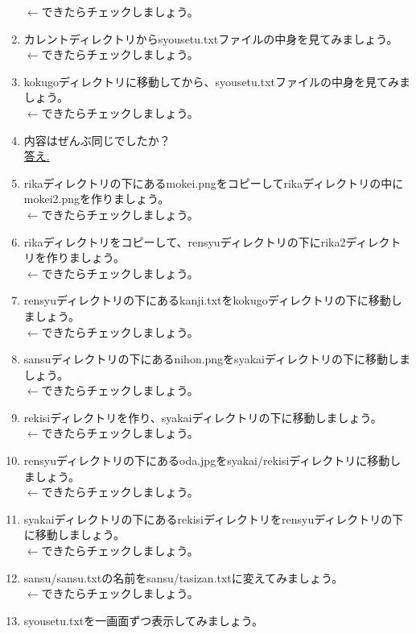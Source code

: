 \begin{tcolorbox}[title=\useOmetoi,breakable]
\begin{enumerate}
\fbox{\phantom{白}} $\leftarrow$できたらチェックしましょう。
\item カレントディレクトリからsyousetu.txtファイルの中身を見てみましょう。\\
\fbox{\phantom{白}} $\leftarrow$できたらチェックしましょう。
\item kokugoディレクトリに移動してから、syousetu.txtファイルの中身を見てみましょう。\\
\fbox{\phantom{白}} $\leftarrow$できたらチェックしましょう。
\item 内容はぜんぶ同じでしたか？\\
\underline{答え.\hspace{0.8\linewidth}}
\item rikaディレクトリの下にあるmokei.pngをコピーしてrikaディレクトリの中にmokei2.pngを作りましょう。\\
\fbox{\phantom{白}} $\leftarrow$できたらチェックしましょう。
\item rikaディレクトリをコピーして、rensyuディレクトリの下にrika2ディレクトリを作りましょう。\\
\fbox{\phantom{白}} $\leftarrow$できたらチェックしましょう。
\item rensyuディレクトリの下にあるkanji.txtをkokugoディレクトリの下に移動しましょう。\\
\fbox{\phantom{白}} $\leftarrow$できたらチェックしましょう。
\item sansuディレクトリの下にあるnihon.pngをsyakaiディレクトリの下に移動しましょう。\\
\fbox{\phantom{白}} $\leftarrow$できたらチェックしましょう。
\item rekisiディレクトリを作り、syakaiディレクトリの下に移動しましょう。\\
\fbox{\phantom{白}} $\leftarrow$できたらチェックしましょう。
\item rensyuディレクトリの下にあるoda.jpgをsyakai/rekisiディレクトリに移動しましょう。\\
\fbox{\phantom{白}} $\leftarrow$できたらチェックしましょう。
\item syakaiディレクトリの下にあるrekisiディレクトリをrensyuディレクトリの下に移動しましょう。\\
\fbox{\phantom{白}} $\leftarrow$できたらチェックしましょう。
\item sansu/sansu.txtの名前をsansu/tasizan.txtに変えてみましょう。\\
\fbox{\phantom{白}} $\leftarrow$できたらチェックしましょう。
\item syousetu.txtを一画面ずつ表示してみましょう。

\end{enumerate}
\end{tcolorbox}
